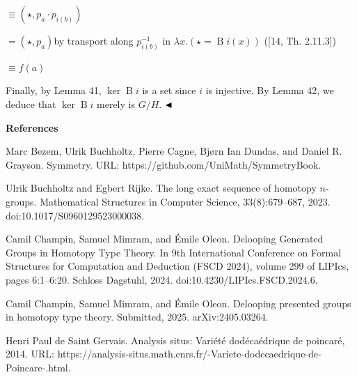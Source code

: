 \documentclass[10pt,a4paper]{article}
\begin{document}
\par  \quad  \quad  $\displaystyle\equiv(\star,p_{a}\cdot p_{i(b)})$\quad  \quad  
 
\par  \quad  \quad  $\displaystyle=(\star,p_{a})$\quad  by transport along $p_{i(b)}^{-1}$ in $\lambda x.(\star=\operatorname{B}i(x))$ ([14, Th. 2.11.3])\quad  \quad  
 
\par  \quad  \quad  $\displaystyle\equiv f(a)$\quad  \quad  
  
Finally, by Lemma 41, $\ker\operatorname{B}i$ is a set since $i$ is injective. By Lemma 42, we deduce that $\ker\operatorname{B}i$ merely is $G/H$. $\hfill\blacktriangleleft$\par
 
 
 


 
\par\medskip\noindent\textbf{References}\par
  
\par\noindent  [1]  Marc Bezem, Ulrik Buchholtz, Pierre Cagne, Bjørn Ian Dundas, and Daniel R. Grayson.  Symmetry.  URL: https://github.com/UniMath/SymmetryBook.  
 
\par\noindent  [2]  Ulrik Buchholtz and Egbert Rijke.  The long exact sequence of homotopy $n$-groups.  Mathematical Structures in Computer Science, 33(8):679–687, 2023.  doi:10.1017/S0960129523000038.  
 
\par\noindent  [3]  Camil Champin, Samuel Mimram, and Émile Oleon.  Delooping Generated Groups in Homotopy Type Theory.  In 9th International Conference on Formal Structures for Computation and Deduction (FSCD 2024), volume 299 of LIPIcs, pages 6:1–6:20. Schloss Dagstuhl, 2024.  doi:10.4230/LIPIcs.FSCD.2024.6.  
 
\par\noindent  [4]  Camil Champin, Samuel Mimram, and Émile Oleon.  Delooping presented groups in homotopy type theory.  Submitted, 2025.  arXiv:2405.03264.  
 
\par\noindent  [5]  Henri Paul de Saint Gervais.  Analysis situs: Variété dodécaédrique de poincaré, 2014.  URL: https://analysis-situs.math.cnrs.fr/-Variete-dodecaedrique-de-Poincare-.html.  
 
\end{document}
